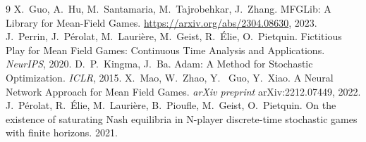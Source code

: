 \documentclass[11pt,a4paper]{article}
\begin{document}
\begin{thebibliography}{9}
 X.~Guo, A.~Hu, M.~Santamaria, M.~Tajrobehkar, J.~Zhang.
  MFGLib: A Library for Mean-Field Games.
  \url{https://arxiv.org/abs/2304.08630}, 2023.
 J.~Perrin, J.~Pérolat, M.~Laurière, M.~Geist, R.~Élie, O.~Pietquin.
  Fictitious Play for Mean Field Games: Continuous Time Analysis and Applications.
  \emph{NeurIPS}, 2020.
 D.~P.~Kingma, J.~Ba. Adam: A Method for Stochastic Optimization.
  \emph{ICLR}, 2015.
 X.~Mao, W.~Zhao, Y.~ Guo, Y.~Xiao. A Neural Network Approach for
  Mean Field Games. \emph{arXiv preprint} arXiv:2212.07449, 2022.
 J.~Pérolat, R.~Élie, M.~Laurière, B.~Pioufle, M.~Geist, O.~Pietquin.
  On the existence of saturating Nash equilibria in N-player discrete-time
  stochastic games with finite horizons. 2021.
\end{thebibliography}
\end{document}
